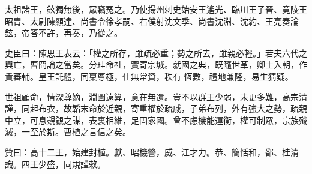 \begin{pinyinscope}
 太祖諸王，鉉獨無後，眾竊冤之。乃使揚州刺史始安王遙光、臨川王子晉、竟陵王昭胄、太尉陳顯達、尚書令徐孝嗣、右僕射沈文季、尚書沈淵、沈約、王亮奏論鉉，帝答不許，再奏，乃從之。



 史臣曰：陳思王表云：「權之所存，雖疏必重；勢之所去，雖親必輕。」若夫六代之興亡，曹冏論之當矣。分珪命社，實寄宗城。就國之典，既隨世革，卿士入朝，作貴蕃輔。皇王託體，同稟尊極，仕無常資，秩有
 恆數，禮地兼隆，易生猜疑。



 世祖顧命，情深尊嫡，淵圖遠算，意在無遺。豈不以群王少弱，未更多難，高宗清謹，同起布衣，故韜末命於近親，寄重權於疏戚，子弟布列，外有強大之勢，疏親中立，可息覬覦之謀，表裏相維，足固家國。曾不慮機能運衡，權可制眾，宗族殲滅，一至於斯。曹植之言信之矣。



 贊曰：高十二王，始建封植。獻、昭機警，威、江才力。恭、簡恬和，鄱、桂清識。四王少盛，同規謹敕。



\end{pinyinscope}